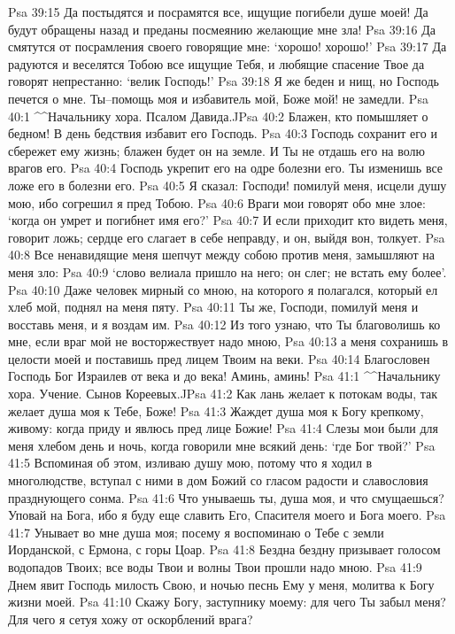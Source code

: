 Psa 39:15  Да постыдятся и посрамятся все, ищущие погибели душе моей! Да будут обращены назад и преданы посмеянию желающие мне зла!
Psa 39:16  Да смятутся от посрамления своего говорящие мне: `хорошо! хорошо!'
Psa 39:17  Да радуются и веселятся Тобою все ищущие Тебя, и любящие спасение Твое да говорят непрестанно: `велик Господь!'
Psa 39:18  Я же беден и нищ, но Господь печется о мне. Ты--помощь моя и избавитель мой, Боже мой! не замедли.
Psa 40:1  ^^Начальнику хора. Псалом Давида.^^
Psa 40:2  Блажен, кто помышляет о бедном! В день бедствия избавит его Господь.
Psa 40:3  Господь сохранит его и сбережет ему жизнь; блажен будет он на земле. И Ты не отдашь его на волю врагов его.
Psa 40:4  Господь укрепит его на одре болезни его. Ты изменишь все ложе его в болезни его.
Psa 40:5  Я сказал: Господи! помилуй меня, исцели душу мою, ибо согрешил я пред Тобою.
Psa 40:6  Враги мои говорят обо мне злое: `когда он умрет и погибнет имя его?'
Psa 40:7  И если приходит кто видеть меня, говорит ложь; сердце его слагает в себе неправду, и он, выйдя вон, толкует.
Psa 40:8  Все ненавидящие меня шепчут между собою против меня, замышляют на меня зло:
Psa 40:9  `слово велиала пришло на него; он слег; не встать ему более'.
Psa 40:10  Даже человек мирный со мною, на которого я полагался, который ел хлеб мой, поднял на меня пяту.
Psa 40:11  Ты же, Господи, помилуй меня и восставь меня, и я воздам им.
Psa 40:12  Из того узнаю, что Ты благоволишь ко мне, если враг мой не восторжествует надо мною,
Psa 40:13  а меня сохранишь в целости моей и поставишь пред лицем Твоим на веки.
Psa 40:14  Благословен Господь Бог Израилев от века и до века! Аминь, аминь!
Psa 41:1  ^^Начальнику хора. Учение. Сынов Кореевых.^^
Psa 41:2  Как лань желает к потокам воды, так желает душа моя к Тебе, Боже!
Psa 41:3  Жаждет душа моя к Богу крепкому, живому: когда приду и явлюсь пред лице Божие!
Psa 41:4  Слезы мои были для меня хлебом день и ночь, когда говорили мне всякий день: `где Бог твой?'
Psa 41:5  Вспоминая об этом, изливаю душу мою, потому что я ходил в многолюдстве, вступал с ними в дом Божий со гласом радости и славословия празднующего сонма.
Psa 41:6  Что унываешь ты, душа моя, и что смущаешься? Уповай на Бога, ибо я буду еще славить Его, Спасителя моего и Бога моего.
Psa 41:7  Унывает во мне душа моя; посему я воспоминаю о Тебе с земли Иорданской, с Ермона, с горы Цоар.
Psa 41:8  Бездна бездну призывает голосом водопадов Твоих; все воды Твои и волны Твои прошли надо мною.
Psa 41:9  Днем явит Господь милость Свою, и ночью песнь Ему у меня, молитва к Богу жизни моей.
Psa 41:10  Скажу Богу, заступнику моему: для чего Ты забыл меня? Для чего я сетуя хожу от оскорблений врага?
